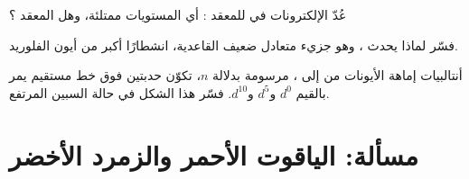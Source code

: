 \begin{exercise}[$\star\star\star$]\label{exo:b2:ligand-field:10}
عُدّ الإلكترونات في  للمعقد : أي المستويات ممتلئة،
وهل المعقد ؟
\end{exercise}

\begin{exercise}[$\star\star\star$]\label{exo:b2:ligand-field:11}
فسّر لماذا يحدث ، وهو جزيء متعادل ضعيف القاعدية، انشطارًا أكبر من
أيون الفلوريد.
\end{exercise}

\begin{exercise}[$\star\star\star$]\label{exo:b2:ligand-field:12}
أنتالبيات إماهة الأيونات  من  إلى ، مرسومة بدلالة $n$، تكوّن
حدبتين فوق خط مستقيم يمر بالقيم $d^0$ و$d^5$ و$d^{10}$. فسّر هذا الشكل 
في حالة السبين المرتفع.
\end{exercise}

\section{مسألة: الياقوت الأحمر والزمرد الأخضر}

